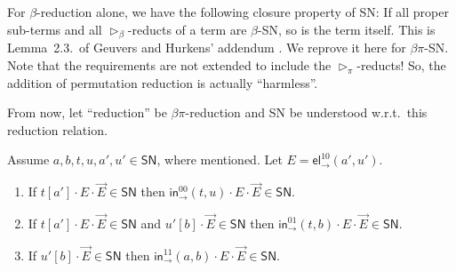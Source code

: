 \documentclass[a4paper,USenglish,cleveref, autoref, thm-restate]{lipics-v2021}
\newcommand{\wrt}{w.r.t.\xspace}
\newcommand{\tin}{\ensuremath{\mathsf{in}}}
\newcommand{\inn}[2]{\ensuremath{\tin_{#1}^{#2}}}
\newcommand{\tel}{\mathsf{el}}
\newcommand{\el}[2]{\ensuremath{\tel_{#1}^{#2}}}
\newcommand{\whd}[1][]{\rhd_{#1}}
\newcommand{\SN}{\mathsf{SN}}
\begin{document}
For $\beta$-reduction alone, we have the following closure property of
SN:  If all proper sub-terms and all $\whd[\beta]$-reducts of a term
are $\beta$-SN, so is the term itself.  This is Lemma~2.3.\ of Geuvers and
Hurkens' addendum \cite{geuversHurkens:addendumTypes17}.  We reprove
it here for $\beta\pi$-SN.  Note that the requirements are not extended to
include the $\whd[\pi]$-reducts!
So, the addition of permutation reduction is actually ``harmless''.

From now, let ``reduction'' be $\beta\pi$-reduction and SN be
understood \wrt\ this reduction relation.

\begin{lemma}
  \label{lem:whexp}
  Assume $a,b,t,u,a',u' \in \SN$, where mentioned.
  Let $E = \el\to{10}(a',u')$.
  \begin{enumerate}
  \item \label{it:zerozero}
    If $t[a'] \cdot E \cdot \vec E \in \SN$ then
    $\inn\to{00}(t,u) \cdot E \cdot \vec E \in \SN$.
  \item \label{it:zeroone}
    If $t[a'] \cdot E \cdot \vec E \in \SN$
    and $u'[b] \cdot \vec E \in \SN$
    then $\inn\to{01}(t,b) \cdot E \cdot \vec E \in \SN$.
  \item \label{it:oneone}
    If  $u'[b] \cdot \vec E \in \SN$
    then $\inn\to{11}(a,b) \cdot E \cdot \vec E \in \SN$.
  \end{enumerate}
\end{lemma}
\end{document}
